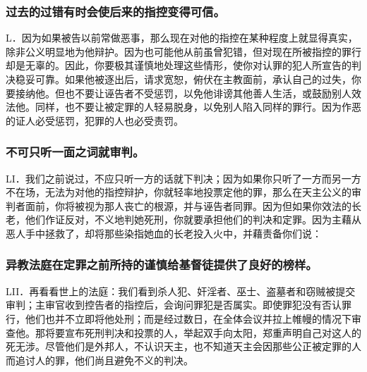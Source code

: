 
\subsubsection{过去的过错有时会使后来的指控变得可信。}

L．因为如果被告以前常做恶事，那么现在对他的指控在某种程度上就显得真实，除非公义明显地为他辩护。因为也可能他从前虽曾犯错，但对现在所被指控的罪行却是无辜的。因此，你要极其谨慎地处理这些情形，使你对认罪的犯人所宣告的判决稳妥可靠。如果他被逐出后，请求宽恕，俯伏在主教面前，承认自己的过失，你要接纳他。但也不要让诬告者不受惩罚，以免他诽谤其他善人生活，或鼓励别人效法他。同样，也不要让被定罪的人轻易脱身，以免别人陷入同样的罪行。因为作恶的证人必受惩罚，犯罪的人也必受责罚。\par


\subsubsection{不可只听一面之词就审判。}

LI．我们之前说过，不应只听一方的话就下判决；因为如果你只听了一方而另一方不在场，无法为对他的指控辩护，你就轻率地投票定他的罪，那么在天主公义的审判者面前，你将被视为那人丧亡的根源，并与诬告者同罪。因为但如果你效法的长老，他们作证反对，不义地判她死刑，你就要承担他们的判决和定罪。因为主藉从恶人手中拯救了，却将那些染指她血的长老投入火中，并藉责备你们说：\par


\subsubsection{异教法庭在定罪之前所持的谨慎给基督徒提供了良好的榜样。}

LII．再看看世上的法庭：我们看到杀人犯、奸淫者、巫士、盗墓者和窃贼被提交审判；主审官收到控告者的指控后，会询问罪犯是否属实。即使罪犯没有否认罪行，他们也并不立即将他处刑；而是经过数日，在全体会议并拉上帷幔的情况下审查他。那将要宣布死刑判决和投票的人，举起双手向太阳，郑重声明自己对这人的死无涉。尽管他们是外邦人，不认识天主，也不知道天主会因那些公正被定罪的人而追讨人的罪，他们尚且避免不义的判决。\par

